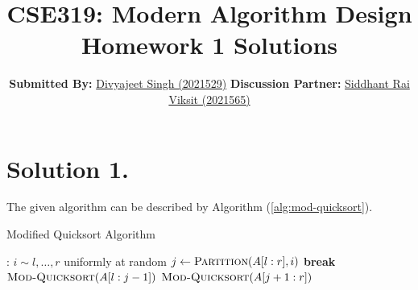 \documentclass[9pt]{article}
\title{
    \textbf{CSE319: Modern Algorithm Design} \\
    \textbf{\large{Homework 1 Solutions}}
}
\author{
    \textbf{Submitted By:} \href{mailto:divyajeet21529@iiitd.ac.in}{Divyajeet Singh (2021529)}
    \hfill
    \textbf{Discussion Partner:} \href{mailto:siddhant21565@iiitd.ac.in}{Siddhant Rai Viksit (2021565)}
}
\date{}
\begin{document}
\maketitle

\section*{Solution 1.}
The given algorithm can be described by Algorithm (\ref{alg:mod-quicksort}).
\begin{algorithm}
    \caption{Modified Quicksort Algorithm}
    \label{alg:mod-quicksort}
    \begin{algorithmic}[1]
        :
                \State \Return
            \EndIf
                \State $i \sim l, \dots, r$ uniformly at random
                \State $j \gets \Call{Partition}{A[l:r], i}$
                    \State \textbf{break}
                \EndIf
            \EndWhile
            \State $\Call{Mod-Quicksort}{A[l:j-1]}$
            \State $\Call{Mod-Quicksort}{A[j+1:r]}$
        \EndProcedure
    \end{algorithmic}
\end{algorithm}
\end{document}
